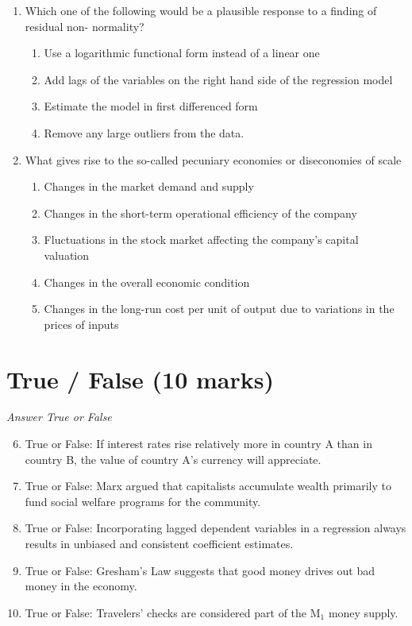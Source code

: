 \documentclass[12pt]{article}
\begin{document}
\begin{enumerate}[label=\arabic*.]
\begin{enumerate}[label=(\alph*)]
\end{enumerate}
\item Which one of the following would be a plausible response to a finding of residual non- normality?
\begin{enumerate}[label=(\alph*)]
    \item Use a logarithmic functional form instead of a linear one
    \item Add lags of the variables on the right hand side of the regression model
    \item Estimate the model in first differenced form
    \item Remove any large outliers from the data.
\end{enumerate}
\item What gives rise to the so-called pecuniary economies or diseconomies of scale
\begin{enumerate}[label=(\alph*)]
    \item Changes in the market demand and supply
    \item Changes in the short-term operational efficiency of the company
    \item Fluctuations in the stock market affecting the company's capital valuation
    \item Changes in the overall economic condition
    \item Changes in the long-run cost per unit of output due to variations in the prices of inputs
\end{enumerate}
\end{enumerate}

\section*{True / False (10 marks)}
\textit{Answer True or False}
\begin{enumerate}[label=\arabic*.]
\setcounter{enumi}{5}
\item True or False: If interest rates rise relatively more in country A than in country B, the value of country A's currency will appreciate.
\item True or False: Marx argued that capitalists accumulate wealth primarily to fund social welfare programs for the community.
\item True or False: Incorporating lagged dependent variables in a regression always results in unbiased and consistent coefficient estimates.
\item True or False: Gresham's Law suggests that good money drives out bad money in the economy.
\item True or False: Travelers' checks are considered part of the M$_{1}$ money supply.
\end{enumerate}
\end{document}
